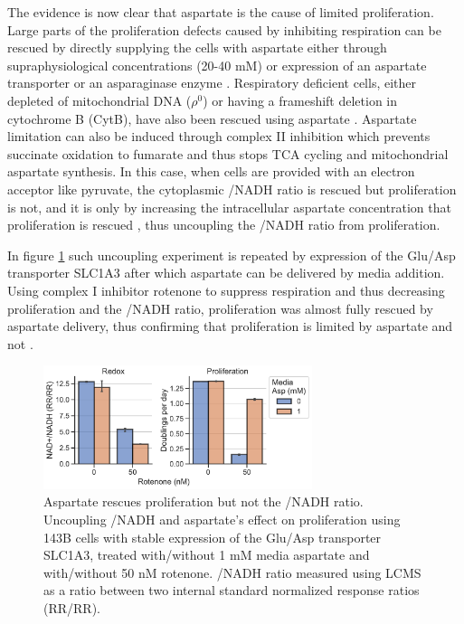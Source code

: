 The evidence is now clear that aspartate is the cause of limited proliferation.
Large parts of the proliferation defects caused by inhibiting respiration can be rescued by directly supplying the cells with aspartate either through supraphysiological concentrations (20-40 mM) \cite{Gui2016-ca, Birsoy2015-pg, Sullivan2015-xf, Krall2021-mb} or expression of an aspartate transporter or an asparaginase enzyme \cite{Birsoy2015-pg, Pavlova2018-nl, Garcia-Bermudez2018-mj, Sullivan2018-gz}.
Respiratory deficient cells, either depleted of mitochondrial DNA ($\rho^0$) or having a frameshift deletion in cytochrome B (CytB), have also been rescued using aspartate \cite{Sullivan2015-xf, Birsoy2015-pg}.
Aspartate limitation can also be induced through complex II inhibition which prevents succinate oxidation to fumarate and thus stops TCA cycling and mitochondrial aspartate synthesis.
In this case, when cells are provided with an electron acceptor like pyruvate, the cytoplasmic \NAD/NADH ratio is rescued but proliferation is not, and it is only by increasing the intracellular aspartate concentration that proliferation is rescued \cite{Hart2023-gp}, thus uncoupling the \NAD/NADH ratio from proliferation.

In figure \ref{fig:ch1:redox-prlfr_uncpl} such uncoupling experiment is repeated by expression of the Glu/Asp transporter SLC1A3 after which aspartate can be delivered by media addition.
Using complex I inhibitor rotenone to suppress respiration and thus decreasing proliferation and the \NAD/NADH ratio, proliferation was almost fully rescued by aspartate delivery, thus confirming that proliferation is limited by aspartate and not \NAD.

\begin{figure}
    \centering
    \includegraphics[width=0.70\textwidth]{figures/chap1/redox-prlfr_uncpl.pdf}
    \caption[Aspartate rescues proliferation but not the \NAD/NADH ratio.]{
    Aspartate rescues proliferation but not the \NAD/NADH ratio.
    Uncoupling \NAD/NADH and aspartate's effect on proliferation using 143B cells with stable expression of the Glu/Asp transporter SLC1A3, treated with/without 1 mM media aspartate and with/without 50 nM rotenone.
    \NAD/NADH ratio measured using LCMS as a ratio between two internal standard normalized response ratios (RR/RR).
    }
    \label{fig:ch1:redox-prlfr_uncpl}
\end{figure}


